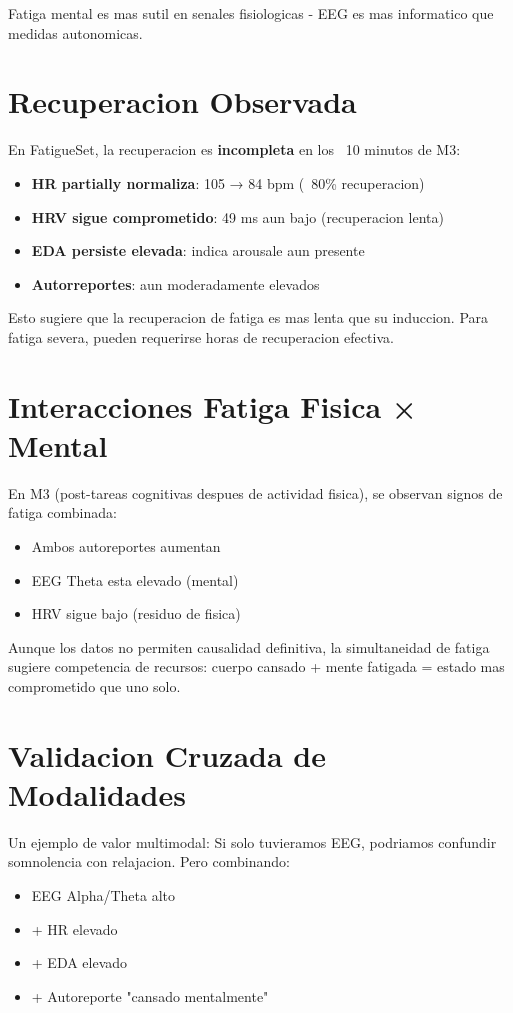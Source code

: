 Fatiga mental es mas sutil en senales fisiologicas - EEG es mas informatico que medidas autonomicas.

\section{Recuperacion Observada}

En FatigueSet, la recuperacion es \textbf{incompleta} en los ~10 minutos de M3:

\begin{itemize}
    \item \textbf{HR partially normaliza}: 105 → 84 bpm (~80\% recuperacion)
    \item \textbf{HRV sigue comprometido}: 49 ms aun bajo (recuperacion lenta)
    \item \textbf{EDA persiste elevada}: indica arousale aun presente
    \item \textbf{Autorreportes}: aun moderadamente elevados
\end{itemize}

Esto sugiere que la recuperacion de fatiga es mas lenta que su induccion.
Para fatiga severa, pueden requerirse horas de recuperacion efectiva.

\section{Interacciones Fatiga Fisica × Mental}

En M3 (post-tareas cognitivas despues de actividad fisica), se observan signos
de fatiga combinada:
\begin{itemize}
    \item Ambos autoreportes aumentan
    \item EEG Theta esta elevado (mental)
    \item HRV sigue bajo (residuo de fisica)
\end{itemize}

Aunque los datos no permiten causalidad definitiva, la simultaneidad de fatiga
sugiere competencia de recursos: cuerpo cansado + mente fatigada = estado mas
comprometido que uno solo.

\section{Validacion Cruzada de Modalidades}

Un ejemplo de valor multimodal: Si solo tuvieramos EEG, podriamos confundir
somnolencia con relajacion. Pero combinando:
\begin{itemize}
    \item EEG Alpha/Theta alto
    \item + HR elevado
    \item + EDA elevado
    \item + Autoreporte "cansado mentalmente"
\end{itemize}

